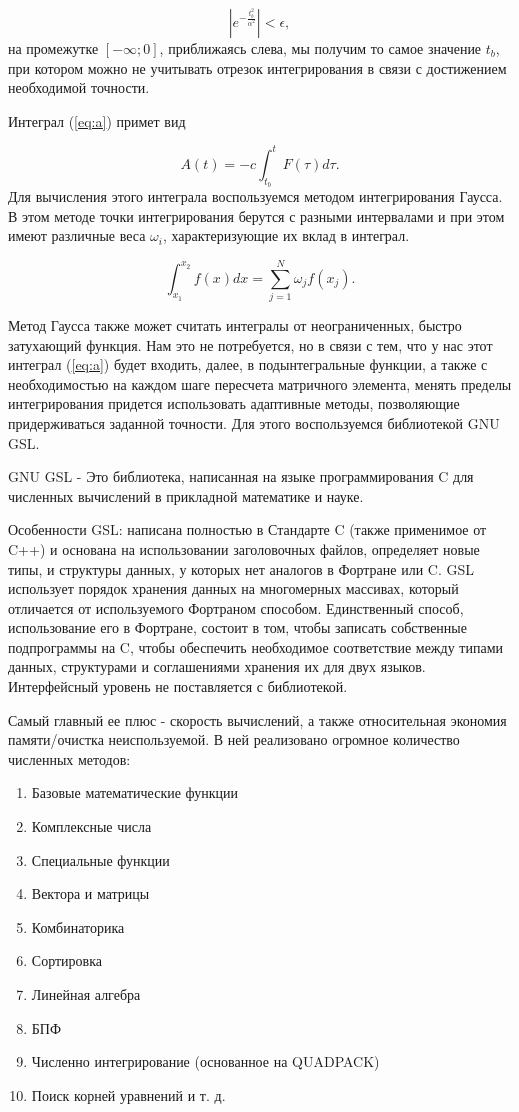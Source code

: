 \documentclass[%
bachelor,    %
natbib,      %
subf,        %
href,        %
colorlinks,  %
]{disser}
\begin{document}
$$
|e^{ -\frac{t_b^2}{\alpha^2} }| < \epsilon,
$$
на промежутке $[-\infty; 0]$, приближаясь слева, мы получим то самое значение $t_b$, при котором можно не учитывать отрезок интегрирования в связи с достижением необходимой точности.

Интеграл (\ref{eq:a}) примет вид

$$\label{eq:easy}
A(t) = -c\int_{t_b}^{t} F(\tau) d\tau.
$$
Для вычисления этого интеграла воспользуемся методом интегрирования Гаусса. В этом методе точки интегрирования берутся с разными интервалами и при этом имеют различные веса $\omega_i$, характеризующие их вклад в интеграл. 

$$
\int_{x_1}^{x_2} f(x) dx = \sum_{j=1}^{N} \omega_j f(x_j).
$$


Метод Гаусса также может считать интегралы от неограниченных, быстро затухающий функция. Нам это не потребуется, но в связи с тем, что у нас этот интеграл (\ref{eq:a}) будет входить, далее, в подынтегральные функции, а также с необходимостью на каждом шаге пересчета матричного элемента, менять пределы интегрирования придется использовать адаптивные методы, позволяющие придерживаться заданной точности. Для этого воспользуемся библиотекой GNU GSL. 

GNU GSL - Это библиотека, написанная на языке программирования C для численных вычислений в прикладной математике и науке.

Особенности GSL: написана полностью в Стандарте C (также применимое от C++) и основана на использовании заголовочных файлов, определяет новые типы, и структуры данных, у которых нет аналогов в Фортране или C. GSL использует порядок хранения данных на многомерных массивах, который отличается от используемого Фортраном способом. Единственный способ, использование его в Фортране, состоит в том, чтобы записать собственные подпрограммы на C, чтобы обеспечить необходимое соответствие между типами данных, структурами и соглашениями хранения их для двух языков. Интерфейсный уровень не поставляется с библиотекой. 

Самый главный ее плюс - скорость вычислений, а также относительная экономия памяти/очистка неиспользуемой. В ней реализовано огромное количество численных методов:

\begin{enumerate} 
	\item Базовые математические функции
	\item Комплексные числа
	\item Специальные функции
	\item Вектора и матрицы
	\item Комбинаторика
	\item Сортировка
	\item Линейная алгебра
	\item БПФ
	\item Численно интегрирование (основанное на QUADPACK)
	\item Поиск корней уравнений и т. д.
\end{enumerate}
\end{document}
